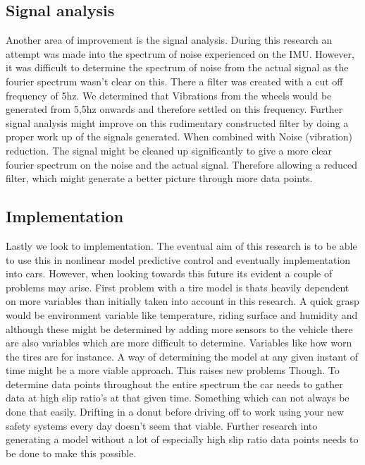 \subsection{Signal analysis}
Another area of improvement is the signal analysis. During this research an attempt was made into the spectrum of noise experienced on the IMU. However, it was difficult to determine the spectrum of noise from the actual signal as the fourier spectrum wasn't clear on this. There a filter was created with a cut off frequency of 5hz. We determined that Vibrations from the wheels would be generated from 5,5hz onwards and therefore settled on this frequency. Further signal analysis might improve on this rudimentary constructed filter by doing a proper work up of the signals generated. When combined with Noise (vibration) reduction. The signal might be cleaned up significantly to give a more clear fourier spectrum on the noise and the actual signal. Therefore allowing a reduced filter, which might generate a better picture through more data points.  
\subsection{Implementation}
Lastly we look to implementation. The eventual aim of this research is to be able to use this in nonlinear model predictive control and eventually implementation into cars. However, when looking towards this future it\textquotesingle s evident a couple of problems may arise. First problem with a tire model is that\textquotesingle s heavily dependent on more variables than initially taken into account in this research. A quick grasp would be environment variable like temperature, riding surface and humidity and although these might be determined by adding more sensors to the vehicle there are also variables which are more difficult to determine. Variables like how worn the tires are for instance. A way of determining the model at any given instant of time might be a more viable approach. This raises new problems Though. To determine data points throughout the entire spectrum the car needs to gather data at high slip ratio's at that given time. Something which can not always be done that easily. Drifting in a donut before driving off to work using your new safety systems every day doesn't seem that viable. Further research into generating a model without a lot of especially high slip ratio data points needs to be done to make this possible.